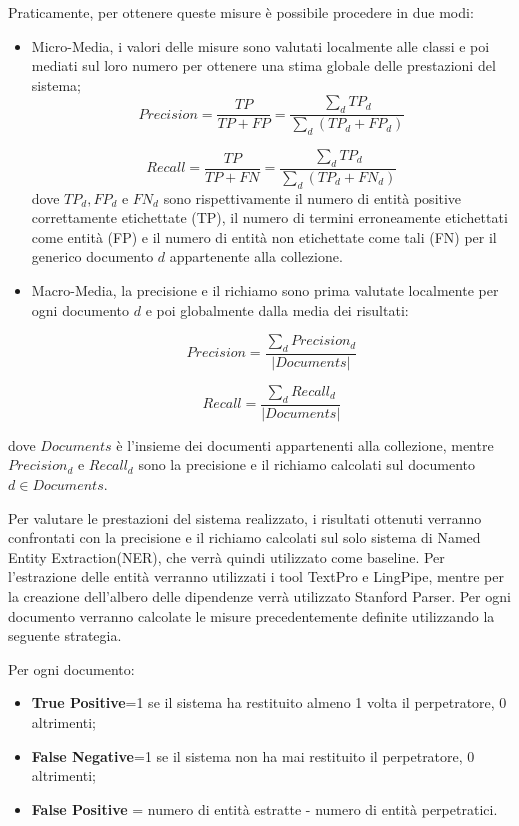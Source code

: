 Praticamente, per ottenere queste misure è possibile procedere in due modi:
\begin{itemize}
	\item Micro-Media, i valori delle misure sono valutati localmente alle classi e poi mediati sul loro numero per ottenere una stima globale delle
prestazioni del sistema;
	\begin{equation}
	 Precision= \frac{TP}{TP+FP}= \frac{\sum_d TP_{d}}{\sum_d (TP_d+FP_d)}
	\end{equation}

	\begin{equation}
	 Recall= \frac{TP}{TP+FN}= \frac{\sum_d TP_{d}}{\sum_d (TP_d+FN_d)}
	\end{equation}
	dove $TP_d, FP_d$ e $FN_d$ sono rispettivamente il numero di entità positive correttamente etichettate (TP), il numero di termini erroneamente etichettati come entità (FP) e il numero di entità non etichettate come tali (FN) per il generico documento $d$ appartenente alla collezione.
	\item Macro-Media, la precisione e il richiamo sono prima valutate localmente per ogni documento $d$ e poi globalmente dalla media dei risultati:
	
	\begin{equation}
	Precision= \frac{\sum_d Precision_d}{|Documents|}
	\end{equation}
	
	\begin{equation}
	Recall= \frac{\sum_d Recall_d}{|Documents|}
	\end{equation}
\end{itemize}
dove $Documents$ è l'insieme dei documenti appartenenti alla collezione, mentre $Precision_d$ e $Recall_d$ sono la precisione e il richiamo calcolati sul documento $d \in Documents$.


Per valutare le prestazioni del sistema realizzato, i risultati ottenuti verranno confrontati con la precisione e il richiamo calcolati sul solo sistema di Named Entity Extraction(NER), che verrà quindi utilizzato come baseline. 
Per l'estrazione delle entità verranno utilizzati i tool TextPro e LingPipe, mentre per la creazione dell'albero delle dipendenze verrà utilizzato Stanford Parser. 
Per ogni documento verranno calcolate le misure precedentemente definite utilizzando la seguente strategia.

Per ogni documento:
\begin{itemize}
\item \textbf{True Positive}=1 se il sistema ha restituito almeno 1 volta il perpetratore, 0 altrimenti;
\item \textbf{False Negative}=1 se il sistema non ha mai restituito il perpetratore, 0 altrimenti;
\item \textbf{False Positive} = numero di entità estratte - numero di entità perpetratici.
\end{itemize}


